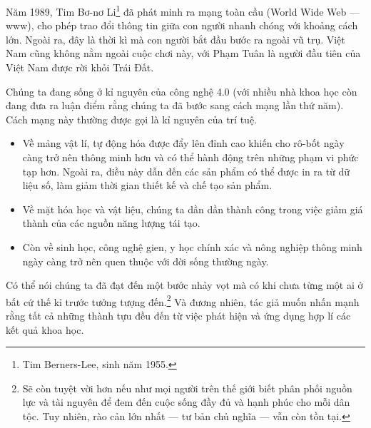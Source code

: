 Năm 1989, Tim Bơ-nơ Li\footnote{Tim Berners-Lee, sinh năm 1955.} đã phát minh ra mạng toàn cầu (World Wide Web --- www), cho phép trao đổi thông tin giữa con người nhanh chóng với khoảng cách lớn. Ngoài ra, đây là thời kì mà con người bắt đầu bước ra ngoài vũ trụ. Việt Nam cũng không nằm ngoài cuộc chơi này, với Phạm Tuân là người đầu tiên của Việt Nam được rời khỏi Trái Đất.

Chúng ta đang sống ở kỉ nguyên của công nghệ 4.0 (với nhiều nhà khoa học còn đang đưa ra luận điểm rằng chúng ta đã bước sang cách mạng lần thứ năm). Cách mạng này thường được gọi là kỉ nguyên của trí tuệ.
\begin{itemize}
    \item Về mảng vật lí, tự động hóa được đẩy lên đỉnh cao khiến cho rô-bốt ngày càng trở nên thông minh hơn và có thể hành động trên những phạm vi phức tạp hơn. Ngoài ra, điều này dẫn đến các sản phẩm có thể được in ra từ dữ liệu số, làm giảm thời gian thiết kế và chế tạo sản phẩm.
    \item Về mặt hóa học và vật liệu, chúng ta dần dần thành công trong việc giảm giá thành của các nguồn năng lượng tái tạo.
    \item Còn về sinh học, công nghệ gien, y học chính xác và nông nghiệp thông minh ngày càng trở nên quen thuộc với đời sống thường ngày.
\end{itemize}
Có thể nói chúng ta đã đạt đến một bước nhảy vọt mà có khi chưa từng một ai ở bất cứ thế kỉ trước tưởng tượng đến.\footnote{Sẽ còn tuyệt vời hơn nếu như mọi người trên thế giới biết phân phối nguồn lực và tài nguyên để đem đến cuộc sống đầy đủ và hạnh phúc cho mỗi dân tộc. Tuy nhiên, rào cản lớn nhất --- tư bản chủ nghĩa --- vẫn còn tồn tại.} Và đương nhiên, tác giả muốn nhấn mạnh rằng tất cả những thành tựu đều đến từ việc phát hiện và ứng dụng hợp lí các kết quả khoa học.